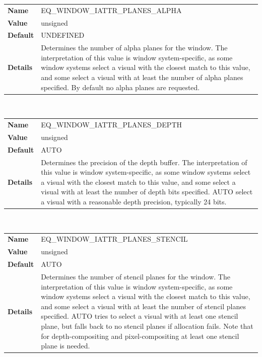 \documentclass[10pt,a4]{scrartcl}
\begin{document}
\begin{center}
\begin{tabularx}{\textwidth}{|l|X|}
  \hline
  \textbf{Name} & EQ\_WINDOW\_IATTR\_PLANES\_ALPHA\\
  \textbf{Value} & unsigned\\
  \textbf{Default} & UNDEFINED\\
  \textbf{Details} & Determines the number of alpha planes for the
  window. The interpretation of this value is window system-specific, as
  some window systems select a visual with the closest match to this
  value, and some select a visual with at least the number of alpha
  planes specified. By default no alpha planes are requested.\\
  \hline
\end{tabularx}\\\vfill

\begin{tabularx}{\textwidth}{|l|X|}
  \hline
  \textbf{Name} & EQ\_WINDOW\_IATTR\_PLANES\_DEPTH\\
  \textbf{Value} & unsigned\\
  \textbf{Default} & AUTO\\
  \textbf{Details} & Determines the precision of the depth buffer. The
  interpretation of this value is window system-specific, as some window
  systems select a visual with the closest match to this value, and some
  select a visual with at least the number of depth bits specified. AUTO
  select a visual with a reasonable depth precision, typically 24 bits.\\
  \hline
\end{tabularx}\\\vfill

\begin{tabularx}{\textwidth}{|l|X|}
  \hline
  \textbf{Name} & EQ\_WINDOW\_IATTR\_PLANES\_STENCIL\\
  \textbf{Value} & unsigned\\
  \textbf{Default} & AUTO\\
  \textbf{Details} & Determines the number of stencil planes for the
  window. The interpretation of this value is window system-specific, as
  some window systems select a visual with the closest match to this
  value, and some select a visual with at least the number of stencil
  planes specified. AUTO tries to select a visual with at least one
  stencil plane, but falls back to no stencil planes if allocation
  fails. Note that for depth-compositing and pixel-compositing at least
  one stencil plane is needed.\\
  \hline
\end{tabularx}\\\vfill


\end{center}
\end{document}
